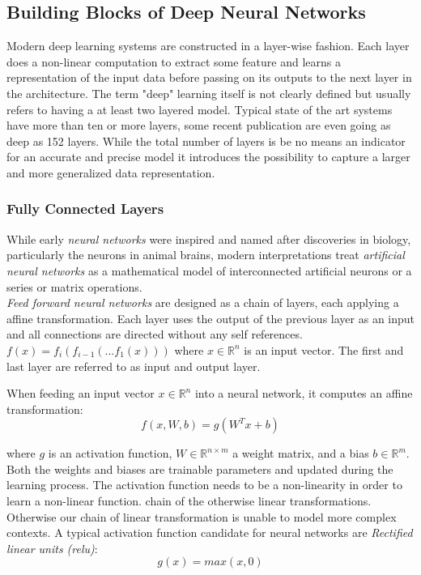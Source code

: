 \subsection{Building Blocks of Deep Neural Networks}
Modern deep learning systems are constructed in a layer-wise fashion. Each layer does a non-linear computation to extract some feature and learns a representation of the input data before passing on its outputs to the next layer in the architecture. The term "deep" learning itself is not clearly defined but usually refers to having a at least two layered model. Typical state of the art systems have more than ten or more layers, some recent publication\cite{he2016deep} are even going as deep as 152 layers. While the total number of layers is be no means an indicator for an accurate and precise model it introduces the possibility to capture a larger and more generalized data representation.

\subsubsection{Fully Connected Layers}
While early \emph{neural networks} were inspired and named after discoveries in biology, particularly the neurons in animal brains, modern interpretations treat \emph{artificial neural networks} as a mathematical model of interconnected artificial neurons or a series or matrix operations.\cite{mcculloch1943logical, rosenblatt1958perceptron}\\ 
\emph{Feed forward neural networks} are designed as a chain of layers, each applying a affine transformation. Each layer uses the output of the previous layer as an input and all connections are directed without any self references. $ f(x) = f_i(f_{i-1}(...f_1(x))) $ where $x \in \mathbb{R}^n $ is an input vector. The first and last layer are referred to as input and output layer.

 When feeding an input vector $x \in \mathbb{R}^n $ into a neural network, it computes an affine transformation: 
 $$
 f(x, W, b) = g(W^Tx + b)
 $$

where $g$ is an activation function, $W \in\mathbb{R}^{n \times m} $ a weight matrix, and a bias $b \in\mathbb{R}^m $.\cite[ch. 6, p. 192]{Goodfellow-et-al-2016} Both the weights and biases are trainable parameters and updated during the learning process. The activation function needs to be a non-linearity in order to learn a non-linear function. chain of the otherwise linear transformations. Otherwise our chain of linear transformation is unable to model more complex contexts. A typical activation function candidate for neural networks are \emph{Rectified linear units (\ac{relu})}\cite{nair2010rectified}:
$$
g(x) = max(x, 0)
$$

